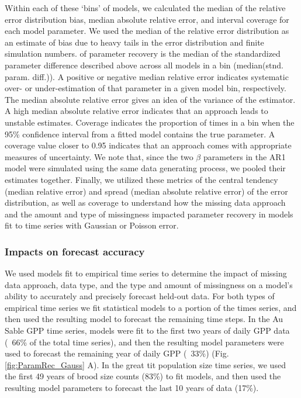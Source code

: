 \documentclass{article}
\begin{document}
\begin{linenumbers}
Within each of these `bins' of models, we calculated the median of the relative error distribution bias, median absolute relative error, and interval coverage for each model parameter. We used the median of the relative error distribution as an estimate of bias due to heavy tails in the error distribution and finite simulation numbers. of parameter recovery is the median of the standardized parameter difference described above across all models in a bin (median(stnd. param. diff.)). A positive or negative median relative error indicates systematic over- or under-estimation of that parameter in a given model bin, respectively. The median absolute relative error gives an idea of the variance of the estimator. A high median absolute relative error indicates that an approach leads to unstable estimates. Coverage indicates the proportion of times in a bin when the 95\% confidence interval from a fitted model contains the true parameter. A coverage value closer to 0.95 indicates that an approach comes with appropriate measures of uncertainty. We note that, since the two $\beta$ parameters in the AR1 model were simulated using the same data generating process, we pooled their estimates together. Finally, we utilized these metrics of the central tendency (median relative error) and spread (median absolute relative error) of the error distribution, as well as coverage to understand how the missing data approach and the amount and type of missingness impacted parameter recovery in models fit to time series with Gaussian or Poisson error.

\subsubsection*{Impacts on forecast accuracy}
We used models fit to empirical time series to determine the impact of missing data approach, data type, and the type and amount of missingness on a model's ability to accurately and precisely forecast held-out data. For both types of empirical time series we fit statistical models to a portion of the times series, and then used the resulting model to forecast the remaining time steps. In the Au Sable GPP time series, models were fit to the first two years of daily GPP data (~66\% of the total time series), and then the resulting model parameters were used to forecast the remaining year of daily GPP (~33\%) (Fig. \ref{fig:ParamRec_Gauss} A). In the great tit population size time series, we used the first 49 years of brood size counts (83\%) to fit models, and then used the resulting model parameters to forecast the last 10 years of data (17\%).


\end{linenumbers}
\end{document}
